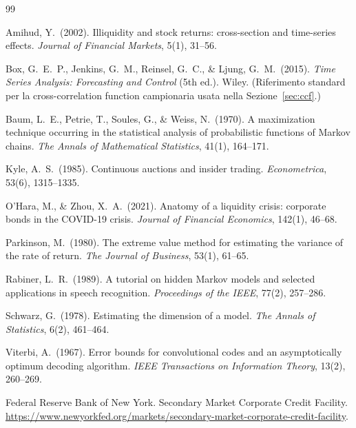 \documentclass[11pt]{article}
\theoremstyle{definition}
\theoremstyle{remark}
\begin{document}
\begin{thebibliography}{99}

 Amihud, Y.\ (2002). Illiquidity and stock returns: cross-section and time-series effects. \emph{Journal of Financial Markets}, 5(1), 31--56.

 Box, G.\ E.\ P., Jenkins, G.\ M., Reinsel, G.\ C., \& Ljung, G.\ M.\ (2015). \emph{Time Series Analysis: Forecasting and Control} (5th ed.). Wiley. (Riferimento standard per la cross-correlation function campionaria usata nella Sezione~\ref{sec:ccf}.)

 Baum, L.\ E., Petrie, T., Soules, G., \& Weiss, N.\ (1970). A maximization technique occurring in the statistical analysis of probabilistic functions of Markov chains. \emph{The Annals of Mathematical Statistics}, 41(1), 164--171.

 Kyle, A.\ S.\ (1985). Continuous auctions and insider trading. \emph{Econometrica}, 53(6), 1315--1335.

 O'Hara, M., \& Zhou, X.\ A.\ (2021). Anatomy of a liquidity crisis: corporate bonds in the COVID-19 crisis. \emph{Journal of Financial Economics}, 142(1), 46--68.

 Parkinson, M.\ (1980). The extreme value method for estimating the variance of the rate of return. \emph{The Journal of Business}, 53(1), 61--65.

 Rabiner, L.\ R.\ (1989). A tutorial on hidden Markov models and selected applications in speech recognition. \emph{Proceedings of the IEEE}, 77(2), 257--286.

 Schwarz, G.\ (1978). Estimating the dimension of a model. \emph{The Annals of Statistics}, 6(2), 461--464.

 Viterbi, A.\ (1967). Error bounds for convolutional codes and an asymptotically optimum decoding algorithm. \emph{IEEE Transactions on Information Theory}, 13(2), 260--269.

 Federal Reserve Bank of New York. Secondary Market Corporate Credit Facility. \url{https://www.newyorkfed.org/markets/secondary-market-corporate-credit-facility}.

\end{thebibliography}

\appendix
\end{document}
